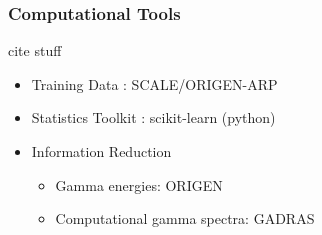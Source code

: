 
\begin{frame}
  \frametitle{Computational Tools}
  cite stuff
  \begin{itemize}
    \item Training Data : SCALE/ORIGEN-ARP
    \item Statistics Toolkit : scikit-learn (python)
    \item Information Reduction
    \begin{itemize}
      \item Gamma energies: ORIGEN
      \item Computational gamma spectra: GADRAS
    \end{itemize}
  \end{itemize}
\end{frame}

